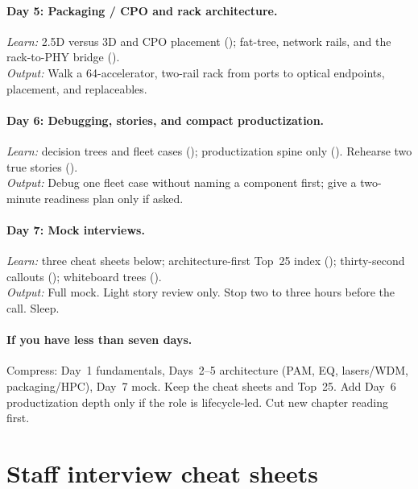 \paragraph{Day 5: Packaging / CPO and rack architecture.}
\textit{Learn:} 2.5D versus 3D and CPO placement
(); fat-tree, network rails, and the rack-to-PHY bridge
().\\
\textit{Output:} Walk a 64-accelerator, two-rail rack from ports to optical
endpoints, placement, and replaceables.

\paragraph{Day 6: Debugging, stories, and compact productization.}
\textit{Learn:} decision trees and fleet cases
(); productization spine
only (). Rehearse two
true stories ().\\
\textit{Output:} Debug one fleet case without naming a component first; give a
two-minute readiness plan only if asked.

\paragraph{Day 7: Mock interviews.}
\textit{Learn:} three cheat sheets below; architecture-first Top~25 index
(); thirty-second callouts ();
whiteboard trees ().\\
\textit{Output:} Full mock. Light story review only. Stop two to three hours
before the call. Sleep.

\paragraph{If you have less than seven days.}
Compress: Day~1 fundamentals, Days~2--5 architecture (PAM, EQ, lasers/WDM,
packaging/HPC), Day~7 mock. Keep the cheat sheets and Top~25. Add Day~6
productization depth only if the role is lifecycle-led. Cut new chapter
reading first.

\clearpage
\section{Staff interview cheat sheets}
\label{sec:interview-cheat-sheet}


